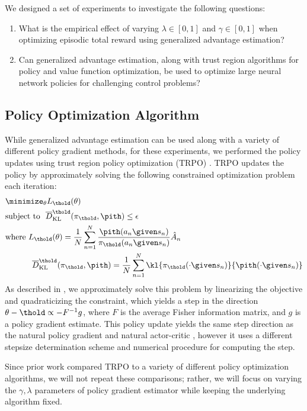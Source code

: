 \documentclass{article}
\newcommand{\hata}{\hat{A}}
\newcommand{\meankl}[1]{{\ensuremath \overline D_{\rm KL}^{#1}}}
\begin{document}
We designed a set of experiments to investigate the following questions:
\begin{enumerate}[leftmargin=*]
\item What is the empirical effect of varying $\lambda \in [0,1]$ and $\gamma \in [0,1]$ when optimizing episodic total reward using generalized advantage estimation?
\item Can generalized advantage estimation, along with trust region algorithms for policy and value function optimization, be used to optimize large neural network policies for challenging control problems?
\end{enumerate}


\subsection{Policy Optimization Algorithm}

While generalized advantage estimation can be used along with a variety of different policy gradient methods, for these experiments, we performed the policy updates using trust region policy optimization  (TRPO) \citep{schulman2015trust}.
TRPO updates the policy by approximately solving the following constrained optimization problem each iteration:
\newcommand{\pithold}{\pi_{\thold}}
\begin{align}
&\minimize_{\theta} L_{\thold}(\theta) \nonumber\\
& \text{subject to } \ \meankl{\thold}(\pithold,\pith) \le \epsilon \nonumber\\
& \text{where } L_{\thold}(\theta) = \frac{1}{N}\sum_{n=1}^{N}
\frac{\pith(a_n \given s_n)}{\pithold(a_n\given s_n)}\hata_n\nonumber\\
& \text{\ \ \ \ \ \ \ \ \ \ } \meankl{\thold}(\pithold,\pith) = \frac{1}{N}\sum_{n=1}^{N} \kl{\pithold(\cdot \given s_n)}{\pith(\cdot  \given s_n)}
\label{eq:trpo}
\end{align}
As described in \citep{schulman2015trust}, we approximately solve this problem by linearizing the objective and quadraticizing the constraint, which yields a step in the direction $\theta - \thold \propto -F^{-1}g$, where $F$ is the average Fisher information matrix, and $g$ is a policy gradient estimate.
This policy update yields the same step direction as the natural policy gradient \citep{kakade2001natural} and natural actor-critic \citep{peters2008natural}, however it uses a different stepsize determination scheme and numerical procedure for computing the step.

Since prior work \citep{schulman2015trust} compared TRPO to a variety of different policy optimization algorithms, we will not repeat these comparisons; rather, we will focus on varying the $\gamma,\lambda$ parameters of policy gradient estimator while keeping the underlying algorithm fixed.
\end{document}
